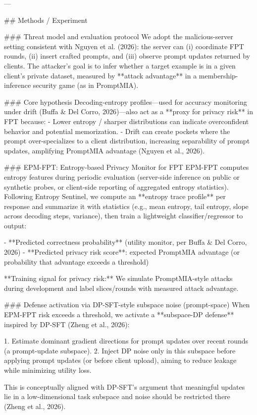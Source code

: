 ---

## Methods / Experiment  

### Threat model and evaluation protocol  
We adopt the malicious-server setting consistent with Nguyen et al. (2026): the server can (i) coordinate FPT rounds, (ii) insert crafted prompts, and (iii) observe prompt updates returned by clients. The attacker’s goal is to infer whether a target example is in a given client’s private dataset, measured by **attack advantage** in a membership-inference security game (as in PromptMIA).

### Core hypothesis  
Decoding-entropy profiles—used for accuracy monitoring under drift (Buffa & Del Corro, 2026)—also act as a **proxy for privacy risk** in FPT because:
- Lower entropy / sharper distributions can indicate overconfident behavior and potential memorization.
- Drift can create pockets where the prompt over-specializes to a client distribution, increasing separability of prompt updates, amplifying PromptMIA advantage (Nguyen et al., 2026).

### EPM-FPT: Entropy-based Privacy Monitor for FPT  
EPM-FPT computes entropy features during periodic evaluation (server-side inference on public or synthetic probes, or client-side reporting of aggregated entropy statistics). Following Entropy Sentinel, we compute an **entropy trace profile** per response and summarize it with statistics (e.g., mean entropy, tail entropy, slope across decoding steps, variance), then train a lightweight classifier/regressor to output:

- **Predicted correctness probability** (utility monitor, per Buffa & Del Corro, 2026)  
- **Predicted privacy risk score**: expected PromptMIA advantage (or probability that advantage exceeds a threshold)

**Training signal for privacy risk:** We simulate PromptMIA-style attacks during development and label slices/rounds with measured attack advantage.

### Defense activation via DP-SFT-style subspace noise (prompt-space)  
When EPM-FPT risk exceeds a threshold, we activate a **subspace-DP defense** inspired by DP-SFT (Zheng et al., 2026):

1. Estimate dominant gradient directions for prompt updates over recent rounds (a prompt-update subspace).  
2. Inject DP noise only in this subspace before applying prompt updates (or before client upload), aiming to reduce leakage while minimizing utility loss.

This is conceptually aligned with DP-SFT’s argument that meaningful updates lie in a low-dimensional task subspace and noise should be restricted there (Zheng et al., 2026).

